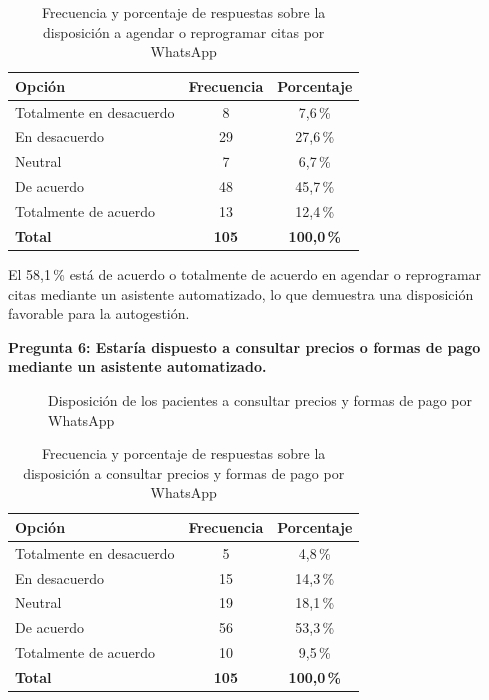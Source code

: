 \begin{table}[H]
\centering
\caption{Frecuencia y porcentaje de respuestas sobre la disposición a agendar o reprogramar citas por WhatsApp}
\label{tab:p5_frecuencia}
\fontsize{10}{12}\selectfont
\renewcommand{\arraystretch}{1.2}
\begin{tabular}{|l|c|c|}
\hline
\textbf{Opción} & \textbf{Frecuencia} & \textbf{Porcentaje} \\ \hline
Totalmente en desacuerdo & 8 & 7{,}6\,\% \\ \hline
En desacuerdo & 29 & 27{,}6\,\% \\ \hline
Neutral & 7 & 6{,}7\,\% \\ \hline
De acuerdo & 48 & 45{,}7\,\% \\ \hline
Totalmente de acuerdo & 13 & 12{,}4\,\% \\ \hline
\textbf{Total} & \textbf{105} & \textbf{100{,}0\,\%} \\ \hline
\end{tabular}
\end{table}

\smallskip
El 58{,}1\,\% está de acuerdo o totalmente de acuerdo en agendar o reprogramar citas
mediante un asistente automatizado, lo que demuestra una disposición favorable para la autogestión.

\medskip
\textbf{Pregunta 6: Estaría dispuesto a consultar precios o formas de pago mediante un asistente automatizado.}

\begin{figure}[H]
\centering
{}
\caption{Disposición de los pacientes a consultar precios y formas de pago por WhatsApp}
\label{fig:p6_torta}
\end{figure}

\begin{table}[H]
\centering
\caption{Frecuencia y porcentaje de respuestas sobre la disposición a consultar precios y formas de pago por WhatsApp}
\label{tab:p6_frecuencia}
\fontsize{10}{12}\selectfont
\renewcommand{\arraystretch}{1.2}
\begin{tabular}{|l|c|c|}
\hline
\textbf{Opción} & \textbf{Frecuencia} & \textbf{Porcentaje} \\ \hline
Totalmente en desacuerdo & 5 & 4{,}8\,\% \\ \hline
En desacuerdo & 15 & 14{,}3\,\% \\ \hline
Neutral & 19 & 18{,}1\,\% \\ \hline
De acuerdo & 56 & 53{,}3\,\% \\ \hline
Totalmente de acuerdo & 10 & 9{,}5\,\% \\ \hline
\textbf{Total} & \textbf{105} & \textbf{100{,}0\,\%} \\ \hline
\end{tabular}
\end{table}


